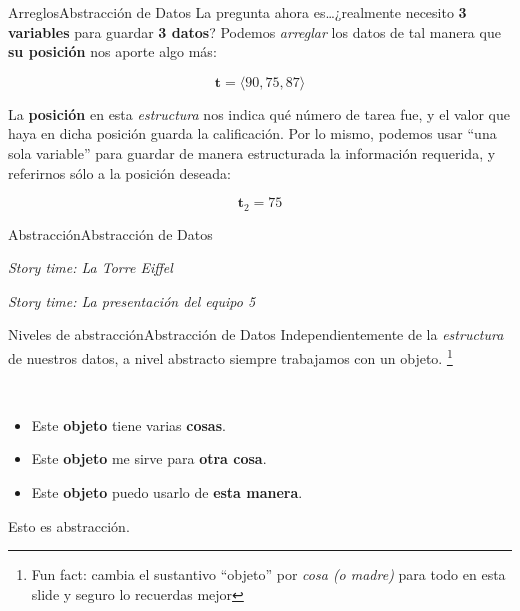 \documentclass[spanish, c]{beamer}
\newcommand\blfootnote[1]{%
\begingroup
\renewcommand\thefootnote{}\footnote{#1}%
\addtocounter{footnote}{-1}%
\endgroup
}
\begin{document}
\begin{frame}{Arreglos}{Abstracción de Datos}
    La pregunta ahora es\dots ¿realmente necesito \textbf{3 variables} para guardar \textbf{3 datos}?
    Podemos \textit{arreglar} los datos de tal manera que \textbf{su posición} nos aporte algo más: \pause

    $$\mathbf{t} = \langle 90, 75, 87 \rangle$$ \pause

    La \textbf{posición} en esta \textit{estructura} nos indica qué número de tarea fue, y el valor que haya en dicha posición guarda la calificación. Por lo mismo, podemos usar ``una sola variable'' para guardar de manera estructurada la información requerida, y referirnos sólo a la posición deseada:

    $$\mathbf{t}_2 = 75$$
\end{frame}

\begin{frame}{Abstracción}{Abstracción de Datos}

    \begin{center}
        \LARGE
        \textit{Story time: La Torre Eiffel}
    \end{center} \pause

    \begin{center}
        \LARGE
        \textit{Story time: La presentación del equipo 5}
    \end{center}
\end{frame}

\begin{frame}{Niveles de abstracción}{Abstracción de Datos}
    Independientemente de la \textit{estructura} de nuestros datos, a nivel abstracto siempre trabajamos con un \alert{objeto}.\blfootnote{Fun fact: cambia el sustantivo ``objeto'' por \textit{cosa {\tiny(o madre)}} para todo en esta slide y seguro lo recuerdas mejor} \pause
    \
    \bigskip

    \begin{itemize}[<+->]
        \item Este \textbf<5->{objeto} tiene varias \textbf<5->{cosas}.
        \item Este \textbf<5->{objeto} me sirve para \textbf<5->{otra cosa}.
        \item Este \textbf<5->{objeto} puedo usarlo de \textbf<5->{esta manera}.
    \end{itemize}

    \pause

    \bigskip

    Esto es \alert{abstracción}.
\end{frame}
\end{document}
